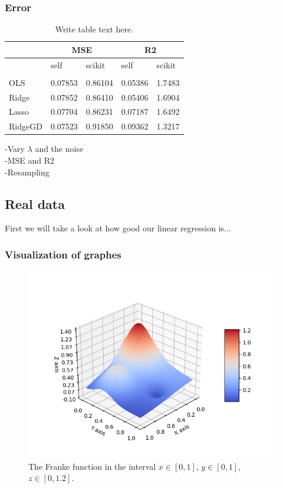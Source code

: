 \subsubsection{Error}

\begin{table} [H]
	\caption{Write table text here.  \vspace{2mm}}
	\begin{tabularx}{\textwidth}{l|XX|XX} \hline\hline
		\label{tab:franke_error}
		& \multicolumn{2}{c}{\textbf{MSE}}&\multicolumn{2}{c}{\textbf{R2}}\\ \hline
		&self&scikit&self&scikit\\ \hline \\
		OLS & 0.07853 & 0.86104 & 0.05386 & 1.7483\\
		Ridge & 0.07852 & 0.86410 & 0.05406 & 1.6904 \\
		Lasso & 0.07704 & 0.86231 & 0.07187 & 1.6492 \\
		RidgeGD & 0.07523 & 0.91850 & 0.09362 & 1.3217 \\ \hline
	\end{tabularx}
\end{table}


-Vary $\lambda$ and the noise\\
-MSE and R2\\
-Resampling



\subsection{Real data}
First we will take a look at how good our linear regression is...
\subsubsection{Visualization of graphes}

 \begin{figure} [H]
 	\centering
 	\includegraphics[scale=0.8]{../plots/franke.png}
 	\caption{The Franke function in the interval $x\in[0,1]$, $y\in[0,1]$, $z\in[0, 1.2]$.}
 	\label{fig:franke2}
 \end{figure}

